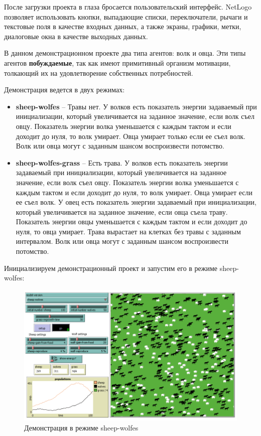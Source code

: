 \documentclass[14pt,a4paper,report]{report}
\begin{document}
После загрузки проекта в глаза бросается пользовательский интерфейс. NetLogo позволяет использовать кнопки, выпадающие списки, переключатели, рычаги и текстовые поля в качестве входных данных, а также экраны, графики, метки, диалоговые окна в качестве выходных данных.

В данном демонстрационном проекте два типа агентов: волк и овца. Эти типы агентов \textbf{побуждаемые}, так как имеют примитивный организм мотивации, толкающий их на удовлетворение собственных потребностей.

Демонстрация ведется в двух режимах:

\begin{itemize}
	\item \textbf{sheep-wolfes} -- Травы нет. У волков есть показатель энергии задаваемый при инициализации, который увеличивается на заданное значение, если волк съел овцу. Показатель энергии волка уменьшается с каждым тактом и если доходит до нуля, то волк умирает. Овца умирает только если ее съел волк. Волк или овца могут с заданным шансом воспроизвести потомство.
	\item \textbf{sheep-wolfes-grass} -- Есть трава. У волков есть показатель энергии задаваемый при инициализации, который увеличивается на заданное значение, если волк съел овцу. Показатель энергии волка уменьшается с каждым тактом и если доходит до нуля, то волк умирает. Овца умирает если ее съел волк. У овец есть показатель энергии задаваемый при инициализации, который увеличивается на заданное значение, если овца съела траву. Показатель энергии овцы уменьшается с каждым тактом и если доходит до нуля, то овца умирает. Трава вырастает на клетках без травы с заданным интервалом. Волк или овца могут с заданным шансом воспроизвести потомство.
\end{itemize}

Инициализируем демонстрационный проект и запустим его в режиме sheep-wolfes:

\begin{figure}[h!]
	\centering
	\includegraphics[scale = 0.68]{images/4.png}
	\caption{Демонстрация в режиме sheep-wolfes}
\end{figure}
\end{document}
